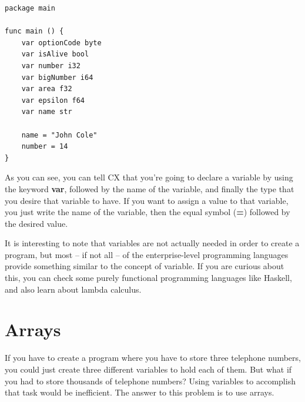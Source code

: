 \documentclass[11pt,fleqn,openany]{book} %
\begin{document}
\begin{lstlisting}[caption={Variable declaration},captionpos=b,label={listing:variable-declaration}]
package main

func main () {
	var optionCode byte
	var isAlive bool
	var number i32
	var bigNumber i64
	var area f32
	var epsilon f64
	var name str
    
    name = "John Cole"
    number = 14
}
\end{lstlisting}

As you can see, you can tell CX that you're going to declare a variable by using the keyword \textbf{var}, followed by the name of the variable, and finally the type that you desire that variable to have. If you want to assign a value to that variable, you just write the name of the variable, then the equal symbol (\textbf{=}) followed by the desired value.

It is interesting to note that variables are not actually needed in order to create a program, but most -- if not all -- of the enterprise-level programming languages provide something similar to the concept of variable. If you are curious about this, you can check some purely functional programming languages like Haskell, and also learn about lambda calculus.

\section{Arrays}


If you have to create a program where you have to store three telephone numbers, you could just create three different variables to hold each of them. But what if you had to store thousands of telephone numbers? Using variables to accomplish that task would be inefficient. The answer to this problem is to use arrays.
\end{document}
